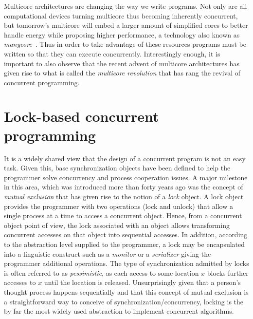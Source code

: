 







Multicore architectures are changing the way we write programs.
Not only are all computational devices
turning multicore thus becoming inherently concurrent, 
but tomorrow's multicore will embed a larger amount of simplified cores to better handle energy while 
proposing higher performance, a technology also known as \emph{manycore}~\cite{Borkar2007}.
Thus in order to take advantage of these resources programs must be written so
that they can execute concurrently.
Interestingly  enough,  
it is important to also observe that the recent advent of multicore 
architectures has  given rise to what is called the {\it multicore  
revolution} \cite{HL08} that has  rang the revival of concurrent programming. 


\section{Lock-based concurrent programming}
%
It is a widely shared view  that the design of a concurrent program is not an easy
task.
Given this, base synchronization objects have been defined to help 
the programmer solve  concurrency and process cooperation  issues. 
A  major milestone in this area, which was introduced 
more than forty years  ago was the concept of {\it mutual exclusion} \cite{D68}
that has given rise  to  the  notion of  a  {\it  lock} object.    
A lock object provides the programmer with two operations (lock and unlock)
that  allow a single process at a time to access a concurrent object. 
Hence, from a  concurrent object point of view,   the  lock associated with
an object allows transforming  concurrent  accesses on  that object  
into sequential accesses.
In addition, according to the abstraction level
supplied to the programmer,  a lock may be encapsulated into a linguistic 
construct such as a {\it monitor} \cite{H74} or a {\it serializer} \cite{HA79}
giving the programmer additional operations.
The type of synchronization admitted by locks is often referred to as \emph{pessimistic}, 
as each access to some location $x$ blocks further accesses to $x$ until the location is released.
Unsurprisingly given that
a person's thought process happens sequentially
and that this concept of mutual exclusion is a straightforward way to
conceive of synchronization/concurrency,
locking is the by far the most widely used abstraction to
implement concurrent algorithms.

